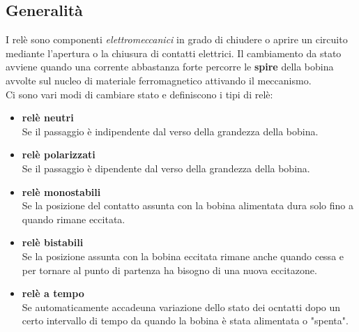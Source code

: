 \documentclass{article}
\begin{document}
\subsection{Generalità}
I relè sono componenti \textit{elettromeccanici} in grado di chiudere o aprire un circuito mediante l'apertura o la chiusura di contatti elettrici.
Il cambiamento da stato avviene quando una corrente abbastanza forte percorre le \textbf{spire} della bobina avvolte sul nucleo di materiale ferromagnetico attivando il meccanismo.\\
Ci sono vari modi di cambiare stato e definiscono i tipi di relè:
\begin{itemize}
    \item \textbf{relè neutri}\\
    Se il passaggio è indipendente dal verso della grandezza della bobina.
    \item \textbf{relè polarizzati}\\
    Se il passaggio è dipendente dal verso della grandezza della bobina.
    \item \textbf{relè monostabili}\\
    Se la posizione del contatto assunta con la bobina alimentata dura solo fino a quando rimane eccitata.
    \item \textbf{relè bistabili}\\
    Se la posizione assunta con la bobina eccitata rimane anche quando cessa e per tornare al punto di partenza ha bisogno di una nuova eccitazone.
    \item \textbf{relè a tempo}\\
    Se automaticamente accadeuna variazione dello stato dei ocntatti dopo un certo intervallo di tempo da quando la bobina è stata alimentata o "spenta".
\end{itemize}
\end{document}
